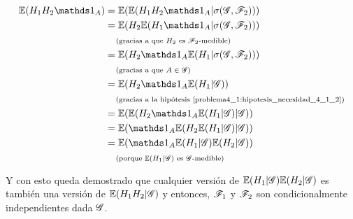 \begin{align}
        \E(H_1 H_2 \indic_A)    &=  \E(\E(H_1 H_2 \indic_A | \sigma(\G, \F_2)))                                     \\
                                &=  \E(H_2 \E(H_1 \indic_A | \sigma(\G, \F_2)))                                     \\
                                &\comment{gracias a que $H_2$ es $\F_2$-medible}                                    \\
                                &=  \E(H_2 \indic_A \E(H_1  | \sigma(\G, \F_2)))                                    \\
                                &\comment{gracias a que $A \in \G$}                                                 \\
                                &=  \E(H_2 \indic_A \E(H_1  | \G))                                                  \\
                                &\comment{gracias a la hipótesis \eqref{problema4_1:hipotesis_necesidad_4_1_2}}     \\
                                &=  \E(\E(H_2 \indic_A \E(H_1  | \G) | \G))                                         \\
                                &=  \E(\indic_A \E(H_2  \E(H_1  | \G) | \G))                                        \\
                                &=  \E(\indic_A \E(H_1  | \G) \E(H_2 | \G))                                         \\
                                &\comment{porque $\E(H_1  | \G)$ es $\G$-medible}
\end{align}

Y con esto queda demostrado que cualquier versión de $\mathbb{E}(H_1  | \mathscr{G}) \mathbb{E}(H_2 | \mathscr{G})$ es también una versión de $\mathbb{E}(H_1 H_2 | \mathscr{G})$
y entonces, $\mathscr{F}_1$ y $\mathscr{F}_2$ son condicionalmente independientes dada $\mathscr{G}$.